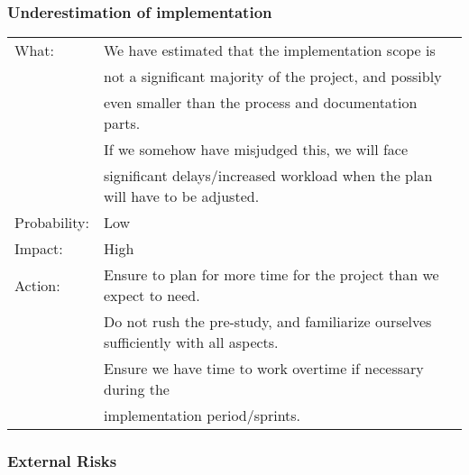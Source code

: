 \subsubsection{Underestimation of implementation}
\begin{tabular}{| l | l |}
	\hline
	What: & We have estimated that the implementation scope is \\
	&not a significant majority of the project, and possibly \\
	&even smaller than the process and documentation parts. \\
	& If we somehow have misjudged this, we will face \\
	& significant delays/increased workload when the plan will have to be adjusted.\\
	\hline
	Probability: & Low \\
	\hline
	Impact: & High \\
	\hline
	Action: & Ensure to plan for more time for the project than we expect to need.\\
	& Do not rush the pre-study, and familiarize ourselves sufficiently with all aspects.\\
	& Ensure we have time to work overtime if necessary during the\\
	& implementation period/sprints.\\
	\hline
\end{tabular}

\subsubsection{External Risks}